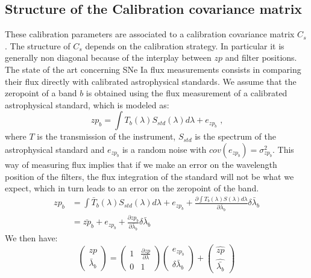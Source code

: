 \documentclass[\docopts]{\docclass}
\begin{document}
\subsection{Structure of the Calibration covariance matrix}
\label{subsec::covmat}
These calibration parameters are associated to a calibration covariance matrix $C_s$.
The structure of $C_s$ depends on the calibration strategy. In particular it is generally non diagonal because of the interplay between $zp$ and filter positions.
The state of the art concerning SNe Ia flux measurements consists in comparing their flux directly with calibrated astrophysical standards.
We assume that the zeropoint of a band $b$ is obtained using the flux measurement of a calibrated astrophysical standard, which is modeled as:
\begin{equation}
zp_b = \int T_b(\lambda) S_{std}(\lambda) d\lambda + e_{zp_b} \text{ ,}
\end{equation}
where $T$ is the transmission of the instrument, $S_{std}$ is the spectrum of the astrophysical standard and $e_{zp_b}$ is a random noise with $cov(e_{zp_b}) = \sigma_{zp_b}^2$.
This way of measuring flux implies that if we make an error on the wavelength position of the filters, the flux integration of the standard will not be what we expect, which in turn leads to an error on the zeropoint of the band.
\begin{equation}
\begin{split}
zp_b &= \int \bar T_b(\lambda) S_{std}(\lambda) d\lambda + e_{zp_b} + \frac{\partial \int{T_b(\lambda)S(\lambda)d\lambda}}{\partial \bar\lambda_b }\delta\bar{\lambda}_b\\
&= \bar{zp}_b + e_{zp_b} + \frac{\partial zp_b}{\partial \bar\lambda_b }\delta\bar\lambda_b 
\end{split}
\end{equation}
We then have:
\begin{equation}
\begin{pmatrix}
  zp \\
  \bar\lambda_b 
\end{pmatrix}
=
\begin{pmatrix}
  1 & \frac{\partial zp}{\partial \lambda} \\
  0 & 1
\end{pmatrix}
\begin{pmatrix}
  e_{zp_b} \\
  \delta\bar\lambda_b 
\end{pmatrix}
+
\begin{pmatrix}
  \widehat{zp} \\
  \widehat{\bar{\lambda_b}}
\end{pmatrix}
\end{equation}
\end{document}
